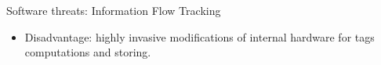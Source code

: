 \begin{frame}{Software threats: Information Flow Tracking}
\begin{minipage}[c]{0.55\textwidth}
{            \begin{alertblock}{}
                \begin{itemize}
                    [square]
                    \justifying
                    \item Disadvantage: highly invasive modifications of internal hardware for tags computations and storing.
                \end{itemize}
            \end{alertblock}
        }
    \end{minipage}\hfill%
    \begin{minipage}[c]{0.4\textwidth}
\end{minipage}
\end{frame}
